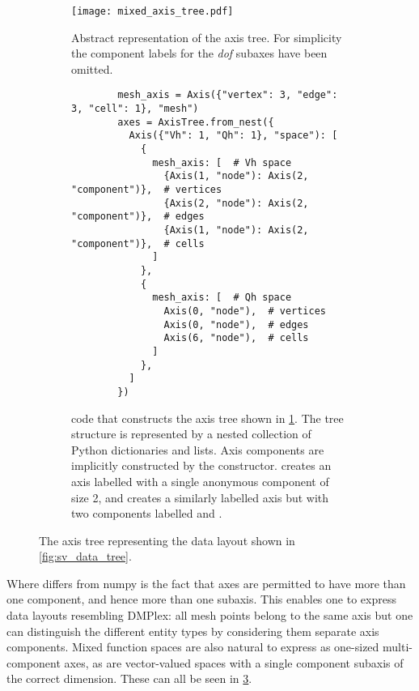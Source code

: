 \documentclass[thesis]{subfiles}
\begin{document}
\begin{figure}
  \centering
  \begin{subfigure}{\textwidth}
    \centering
    \texttt{[image: mixed\_axis\_tree.pdf]}
    \caption{
      Abstract representation of the axis tree.
      For simplicity the component labels for the \textit{dof} subaxes have been omitted.
    }
    \label{fig:axis_tree_abstract}
  \end{subfigure}

  \vspace{1em}

  \begin{subfigure}{\textwidth}
    \centering
    \begin{minipage}{.8\textwidth}
      \begin{verbatim}
        mesh_axis = Axis({"vertex": 3, "edge": 3, "cell": 1}, "mesh")
        axes = AxisTree.from_nest({
          Axis({"Vh": 1, "Qh": 1}, "space"): [
            {
              mesh_axis: [  # Vh space
                {Axis(1, "node"): Axis(2, "component")},  # vertices
                {Axis(2, "node"): Axis(2, "component")},  # edges
                {Axis(1, "node"): Axis(2, "component")},  # cells
              ]
            },
            {
              mesh_axis: [  # Qh space
                Axis(0, "node"),  # vertices
                Axis(0, "node"),  # edges
                Axis(6, "node"),  # cells
              ]
            },
          ]
        })
      \end{verbatim}
    \end{minipage}
    \caption{
       code that constructs the axis tree shown in \cref{fig:axis_tree_abstract}.
      The tree structure is represented by a nested collection of Python dictionaries and lists.
      Axis components are implicitly constructed by the  constructor.
       creates an axis labelled  with a single anonymous component of size 2, and  creates a similarly labelled axis but with two components labelled  and .
    }
    \label{fig:axis_tree_code}
  \end{subfigure}
  \caption{
    The axis tree representing the data layout shown in \cref{fig:sv_data_tree}.
  }
  \label{fig:axis_tree}
\end{figure}

Where  differs from numpy is the fact that axes are permitted to have more than one component, and hence more than one subaxis.
This enables one to express data layouts resembling DMPlex: all mesh points belong to the same axis but one can distinguish the different entity types by considering them separate axis components.
Mixed function spaces are also natural to express as one-sized multi-component axes, as are vector-valued spaces with a single component subaxis of the correct dimension.
These can all be seen in \cref{fig:axis_tree}.
\end{document}

